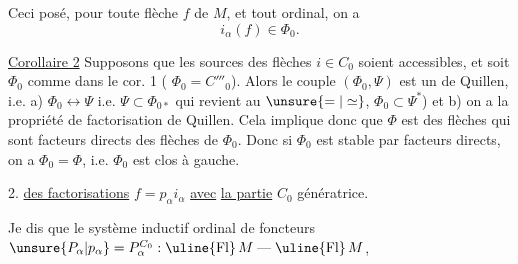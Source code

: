 Ceci posé, pour toute flèche $f$ de $M$, et tout ordinal, on a
\[
i_\alpha(f)\in\Phi_0.
\]

\uline{Corollaire 2} Supposons que les sources des flèches $i\in C_0$ soient accessibles, et soit $\Phi_0$ comme dans le cor. 1 ( $\Phi_0=C'''_0$). Alors le couple $(\Phi_0,\Psi)$  est un  de Quillen, i.e. a) $\Phi_0\longleftrightarrow\Psi$ i.e. $\Psi\subset\Phi_{0*}$  qui revient au $\unsure{=|\simeq}$, $\Phi_0\subset\Psi^*$) et b) on a la propriété de factorisation de Quillen. Cela implique donc que $\Phi$  est  des  flèches qui sont facteurs directs des flèches de $\Phi_0$. Donc si $\Phi_0$ est stable par facteurs directs, on a $\Phi_0=\Phi$, i.e. $\Phi_0$ est clos à gauche.

2. \uline{ des  factorisations} $f=p_\alpha i_\alpha$ \uline{avec} \uline{la partie} $C_0$ génératrice.

Je dis que le système inductif ordinal de foncteurs $\unsure{P_\alpha|p_\alpha}=P_\alpha^{C_0}:\uline{\mathrm{Fl}}\,M\mathrel{\text{---}}\uline{\mathrm{Fl}}\,M$,
